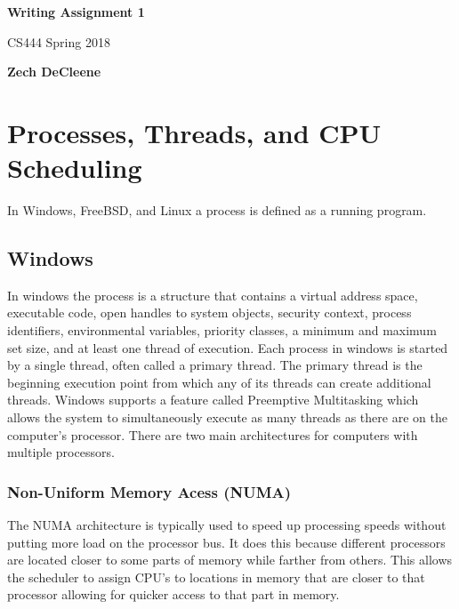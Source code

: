 \documentclass[a4paper,10pt,onecolumn]{article}
\begin{document}
\begin{titlepage}
    \begin{center}
        \vspace*{1cm}
        
        \textbf{Writing Assignment 1}
        
        \vspace{0.5cm}
        CS444 Spring 2018
        
        \vspace{1.5cm}
        
        \textbf{Zech DeCleene}       
    \end{center}
\end{titlepage}


\section{Processes, Threads, and CPU Scheduling}
In Windows, FreeBSD, and Linux a process is defined as a running program. 
\newline
\newline
\subsection{Windows}
In windows the process is a structure that contains a virtual address space, executable code, open handles to system objects, security context, process identifiers, environmental variables, priority classes, a minimum and maximum set size, and at least one thread of execution. Each process in windows is started by a single thread, often called a primary thread. The primary thread is the beginning execution point from which any of its threads can create additional threads. \cite{about}
\newline
\newline
Windows supports a feature called Preemptive Multitasking which allows the system to simultaneously execute as many threads as there are on the computer's processor. There are two main architectures for computers with multiple processors.
\subsubsection{{N}on-{U}niform {M}emory {A}cess {(NUMA)}}
The NUMA architecture is typically used to speed up processing speeds without putting more load on the processor bus. It does this because different processors are located closer to some parts of memory while farther from others. This allows the scheduler to assign CPU's to locations in memory that are closer to that processor allowing for quicker access to that part in memory.
\newline
\end{document}
